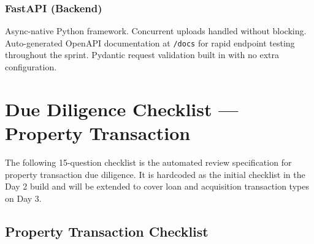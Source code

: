 \documentclass[12pt, a4paper]{article}
\begin{document}
\subsubsection{FastAPI (Backend)}

Async-native Python framework. Concurrent uploads handled without blocking.
Auto-generated OpenAPI documentation at \texttt{/docs} for rapid endpoint testing
throughout the sprint. Pydantic request validation built in with no extra
configuration.

\section{Due Diligence Checklist --- Property Transaction}

The following 15-question checklist is the automated review specification for
property transaction due diligence. It is hardcoded as the initial checklist in
the Day 2 build and will be extended to cover loan and acquisition transaction
types on Day 3.

\subsection{Property Transaction Checklist}
\end{document}
